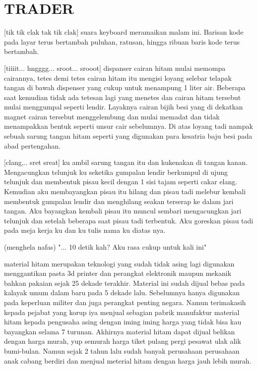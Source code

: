 \chapter{TRADER}

[tik tik clak tak tik clak] suara keyboard meramaikan malam ini. Barisan kode pada layar terus bertambah puluhan, ratusan, hingga ribuan baris kode terus bertambah.

[tiiiit... hngggg... sroot... srooot] dispanser cairan hitam mulai memompa cairannya, tetes demi tetes cairan hitam itu mengisi loyang selebar telapak tangan di bawah dispenser yang cukup untuk menampung 1 liter air. Beberapa saat kemudian tidak ada tetesan lagi yang menetes dan cairan hitam tersebut mulai menggumpal seperti lendir. Layaknya cairan bijih besi yang di dekatkan magnet cairan tersebut menggelembung dan mulai memadat dan tidak menampakkan bentuk seperti unsur cair sebelumnya. Di atas loyang tadi nampak sebuah sarung tangan hitam seperti yang digunakan para kesatria baju besi pada abad pertengahan.

[clang,.. sret sreat] ku ambil sarung tangan itu dan kukenakan di tangan kanan. Mengacungkan telunjuk ku seketika gumpalan lendir berkumpul di ujung telunjuk dan membentuk pisau kecil dengan 1 sisi tajam seperti cakar elang. Kemudian aku membayangkan pisau itu hilang dan pisau tadi melebur kembali membentuk gumpalan lendir dan menghilang seakan terserap ke dalam jari tangan. Aku bayangkan kembali pisau itu muncul sembari mengacungkan jari telunjuk dan setelah beberapa saat pisau tadi terbentuk. Aku goreskan pisau tadi pada meja kerja ku dan ku tulis nama ku diatas nya.

(menghela nafas) "... 10 detik kah? Aku rasa cukup untuk kali ini"

material hitam merupakan teknologi yang sudah tidak asing lagi digunakan menggantikan pasta 3d printer dan perangkat elektronik maupun mekanik bahkan pakaian sejak 25 dekade terakhir. Material ini sudah dijual bebas pada kalayak umum dalam baru pada 5 dekade lalu. Sebelumnya hanya digunakan pada keperluan militer dan juga perangkat penting negara. Namun terimakasih kepada pejabat yang korup iya menjual sebagian pabrik manufaktur material hitam kepada pengusaha asing dengan iming iming harga yang tidak bisa kau bayangkan selama 7 turunan. Akhirnya material hitam dapat dijual belikan dengan harga murah, yup semurah harga tiket pulang pergi pesawat ulak alik bumi-bulan. Namun sejak 2 tahun lalu sudah banyak perusahaan perusahaan anak cabang berdiri dan menjual meterial hitam dengan harga jauh lebih murah.

